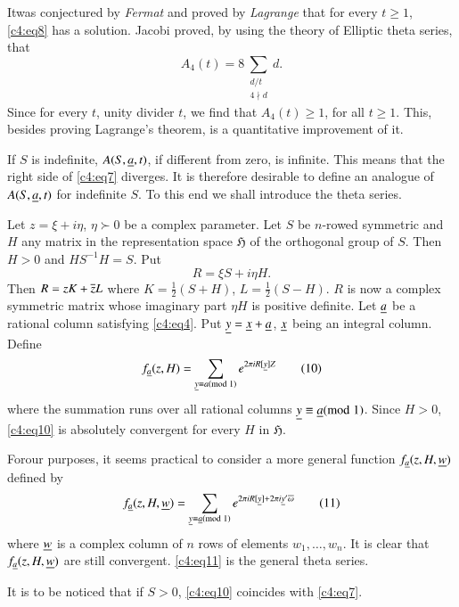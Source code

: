 It\pageoriginale was conjectured by {\em Fermat} and proved by {\em
  Lagrange} that for every $t\geq 1$, \eqref{c4:eq8} has a solution. Jacobi
proved, by using the theory of Elliptic theta series, that
$$
A_{4}(t)=8\sum_{\substack{d/t\\ 4\nmid d}}d.
$$
Since for every $t$, unity divider $t$, we find that $A_{4}(t)\geq 1$,
for all $t\geq 1$. This, besides proving Lagrange's theorem, is a
quantitative improvement of it.

If $S$ is indefinite, $A(S,\underline{a},t)$, if different from zero, is
infinite. This means that the right side of \eqref{c4:eq7} diverges. It is
therefore desirable to define an analogue of $A(S,\underline{a},t)$ for
indefinite $S$. To this end we shall introduce the theta series.

Let $z=\xi+i\eta$, $\eta \succ 0$ be a complex parameter. Let $S$ be
$n$-rowed symmetric and $H$ any matrix in the representation space
$\mathfrak{H}$ of the orthogonal group of $S$. Then $H>0$ and
$HS^{-1}H=S$. Put
\begin{equation*}
R=\xi S+i\eta H.\tag{9}\label{c4:eq9}
\end{equation*}
Then $R=zK+\overline{z}L$ where $K=\frac{1}{2}(S+H)$, $L=\frac{1}{2}(S
-H)$. $R$ is now a complex symmetric matrix whose imaginary part $\eta 
H$ is positive definite. Let $\underline{a}$ be a rational column satisfying
\eqref{c4:eq4}. Put $\underline{y}=\underline{x}+\underline{a}$, $\underline{x}$ being an integral
column. Define
\begin{equation*}
f_{\underline{a}}(z,H)=\sum_{\underline{y}\equiv a (\rm{mod} \; 1)}e^{2\pi iR[\underline{y}]Z}\tag{10}\label{c4:eq10}
\end{equation*}
where the summation runs over all rational columns $\underline{y}\equiv
\underline{a}(\rm{mod} \; 1)$. Since $H>0$, \eqref{c4:eq10} is absolutely convergent for
every $H$ in $\mathfrak{H}$. 

For\pageoriginale our purposes, it seems practical to consider a more
general function $f_{\underline{a}}(z,H,\underline{w})$ defined by
\begin{equation*}
f_{\underline{a}}(z,H,\underline{w})=\sum_{\underline{y}\equiv\underline{a}(\rm{mod} \; 1)}e^{2\pi
  iR[\underline{y}]+2\pi i\underline{y}'\overline{\omega}}\tag{11}\label{c4:eq11}
\end{equation*}
where $\underline{w}$ is a complex column of $n$ rows of elements
$w_{1},\ldots,w_{n}$. It is clear that $f_{\underline{a}}(z,H,\underline{w})$ are
still convergent. \eqref{c4:eq11} is the general theta series.

It is to be noticed that if $S>0$, \eqref{c4:eq10} coincides with
\eqref{c4:eq7}.


